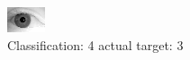\begin{figure}[h!]
\begin{center}
\includegraphics[width=0.60\columnwidth]{figures/ID2057_class_4_target_3.png}
\end{center}
\caption{ Classification: 4 actual target: 3}
\label{fig:ID2057_class_4_target_3}
\end{figure}
